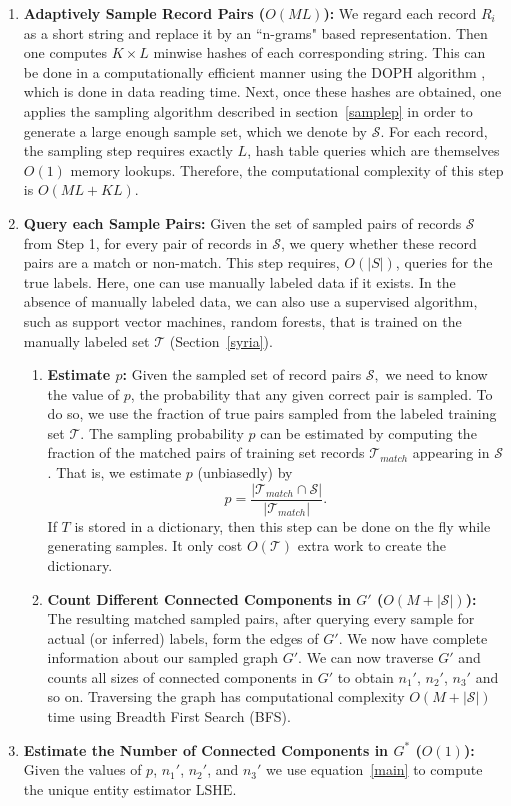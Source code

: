 \documentclass[aoas]{imsart}
\begin{document}
\begin{enumerate}
    \item {\bf Adaptively Sample Record Pairs ($O(ML)$):} We regard each record $R_i$ as a short string and replace it by an ``n-grams" based representation. Then one computes $K \times L$  minwise hashes of each corresponding string. This can be done in a computationally efficient manner using the DOPH algorithm \cite{shrivastava2017optimal}, which is done in data reading time. Next, once these hashes are obtained, one applies the sampling algorithm described in section~\ref{samplep} in order to generate a large enough sample set, which we denote by $\mathcal{S}$. For each record, the sampling step requires exactly $L$, hash table queries which are themselves $O(1)$ memory lookups. Therefore, the computational complexity of this step is $O(ML +KL).$
    \item {\bf Query each Sample Pairs:} Given the set of sampled pairs of records $\mathcal{S}$ from Step 1, for every pair of records in $\mathcal{S}$, we query whether these record pairs are a match or non-match. This step requires, $O(|S|)$, queries for the true labels. Here, one can use manually labeled data if it exists. In the absence of manually labeled data, we can also use a supervised algorithm, such as support vector machines, random forests, that is trained on the manually labeled set $\mathcal{T}$ (Section~\ref{syria}).
    \begin{enumerate}
        \item {\bf Estimate $p$:} Given the sampled set of record pairs $\mathcal{S},$ we need to know the value of $p$, the probability that any given correct pair is sampled. To do so, we use the fraction of true pairs sampled from the labeled training set $\mathcal{T}.$ The sampling probability $p$ can be estimated by computing the fraction of the matched pairs of training set records $\mathcal{T}_{match}$ appearing in $\mathcal{S}$. That is, we estimate $p$ (unbiasedly) by $$p = \frac{|\mathcal{T}_{match} \cap \mathcal{S}|}{|\mathcal{T}_{match}|}.$$ If $T$ is stored in a dictionary, then this step can be done on the fly while generating samples. It only cost $O(\mathcal{T})$ extra work to create the dictionary.

    \item {\bf Count Different Connected Components in $G'$ ($O(M+|\mathcal{S}|)$):}
        The resulting matched sampled pairs, after querying every sample for actual (or inferred) labels, form the edges of $G'$. We now have complete information about our sampled graph $G'$. We can now traverse $G'$ and counts all sizes of connected components in $G'$ to obtain $n_1'$, $n_2'$, $n_3'$ and so on. Traversing the graph has computational complexity $O(M + |\mathcal{S}|)$ time using Breadth First Search (BFS).
    \end{enumerate}
    \item {\bf Estimate the Number of Connected Components in $G^*$ ($O(1)$):} Given the values of $p$, $n_1'$, $n_2'$, and $n_3'$  we use equation~\ref{main} to compute the unique entity estimator $\text{LSHE}$.
\end{enumerate}
\end{document}
